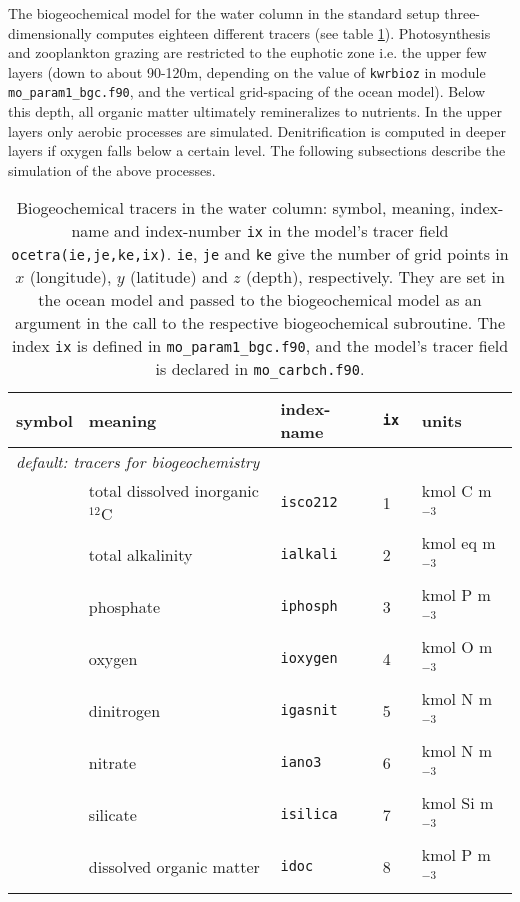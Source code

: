 \documentclass[11pt,a4paper,fleqn,twoside]{article}
\def\pho{\text{\textsc{po$_4$}}\,}
\def\nit{\text{\textsc{no$_3$}}\,}
\def\ntwo{\text{\textsc{n$_2$}}\,}
\def\car{\text{\textsc{c$_T^{12}$}}\,}
\def\oxy{\text{\textsc{o$_2$}}\,}
\def\alk{\text{\textsc{a$_T$}}\,}
\def\sio{\text{\textsc{si(oh)$_4$}}\,}
\def\dom{\text{\textsc{dom}}\,}
\newcommand{\concP}{kmol P m$^{-3}$\,}
\newcommand{\concN}{kmol N m$^{-3}$\,}
\newcommand{\concC}{kmol C m$^{-3}$\,}
\newcommand{\concO}{kmol O m$^{-3}$\,}
\newcommand{\concSi}{kmol Si m$^{-3}$\,}
\newcommand{\concalk}{kmol eq m$^{-3}$\,}
\begin{document}
The biogeochemical model for the water column in the standard setup three-dimensionally
computes eighteen different tracers (see table \ref{tab_water_tracers}). 
Photosynthesis and zooplankton grazing are restricted to the euphotic zone i.e. the  upper few layers
(down to about 90-120m, depending on the value of {\tt kwrbioz} in module {\tt
mo\_param1\_bgc.f90}, and the vertical grid-spacing of the ocean model). Below this
depth, all organic matter ultimately remineralizes to nutrients. In the
upper layers only aerobic processes are simulated. Denitrification is computed in
deeper layers if oxygen falls below a certain level. The following
subsections describe the simulation of the above processes.

\begin{table}[hbt]
\vspace{.2cm}
\caption{\label{tab_water_tracers} Biogeochemical tracers in the water
column: symbol, meaning, index-name and index-number {\tt ix} in the model's tracer field
{\tt ocetra(ie,je,ke,ix)}. {\tt ie}, {\tt je} and {\tt ke} give the
number of grid points in $x$ (longitude), $y$ (latitude) and $z$ (depth),
respectively. They are set in the ocean model and passed to the biogeochemical
model as an argument in the call to the respective biogeochemical subroutine. 
The index {\tt ix} is defined in {\tt mo\_param1\_bgc.f90}, and the model's
tracer field is declared in {\tt mo\_carbch.f90}.} 
\vspace{.2cm}
\begin{center}
\begin{tabular}{lllll} \hline
symbol & meaning        & index-name   & {\tt ix } & units\\ \hline
\multicolumn{5}{l}{\rule{0mm}{4mm}{\it default: tracers for
biogeochemistry}}\\ \hline
\car & total dissolved inorganic $^{12}$C         & {\tt isco212} & 1     &\concC\\
\alk & total alkalinity &{\tt ialkali}  & 2     & \concalk\\
\pho & phosphate        & {\tt iphosph} & 3     &\concP\\
\oxy & oxygen           &{\tt ioxygen}  & 4     &\concO\\
\ntwo& dinitrogen       & {\tt igasnit} & 5     &\concN\\
\nit & nitrate          & {\tt iano3}   & 6     &\concN\\
\sio & silicate         & {\tt isilica} & 7     &\concSi\\
\dom & dissolved organic matter & {\tt idoc}& 8 &\concP\\

\end{tabular}
\end{center}
\end{table}
\end{document}
